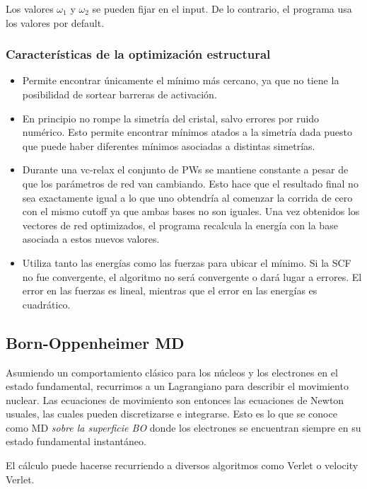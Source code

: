   Los valores $\omega_{1}$ y $\omega_{2}$ se pueden fijar en el input. De lo contrario, el programa usa los valores por default.

\subsubsection{Características de la optimización estructural}

  \begin{itemize}
    \item Permite encontrar únicamente el mínimo más cercano, ya que no tiene la posibilidad de sortear barreras de activación.
    \item En principio no rompe la simetría del cristal, salvo errores por ruido numérico. Esto permite encontrar mínimos atados a la simetría dada puesto que puede haber diferentes mínimos asociadas a distintas simetrías.
    \item Durante una vc-relax el conjunto de PWs se mantiene constante a pesar de que los parámetros de red van cambiando. Esto hace que el resultado final no sea exactamente igual a lo que uno obtendría al comenzar la corrida de cero con el mismo cutoff ya que ambas bases no son iguales. Una vez obtenidos los vectores de red optimizados, el programa recalcula la energía con la base asociada a estos nuevos valores.
    \item Utiliza tanto las energías como las fuerzas para ubicar el mínimo. Si la SCF no fue convergente, el algoritmo no será convergente o dará lugar a errores. El error en las fuerzas es lineal, mientras que el error en las energías es cuadrático.
  \end{itemize}

\subsection{Born-Oppenheimer MD}

  Asumiendo un comportamiento clásico para los núcleos y los electrones en el estado fundamental, recurrimos a un Lagrangiano para describir el movimiento nuclear. Las ecuaciones de movimiento son entonces las ecuaciones de Newton usuales, las cuales pueden discretizarse e integrarse. Esto es lo que se conoce como MD \emph{sobre la superficie BO} donde los electrones se encuentran siempre en su estado fundamental instantáneo.

  El cálculo puede hacerse recurriendo a diversos algoritmos como Verlet o velocity Verlet.

